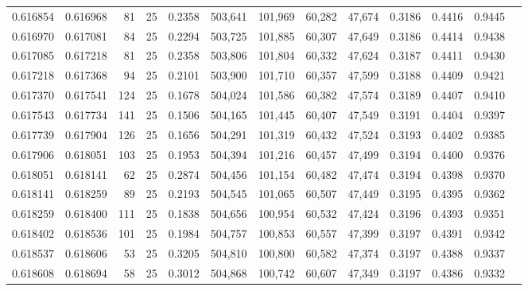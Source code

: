 \begin{tabular}{rrrrrrrrrrrrr}
0.616854 & 0.616968 &    81 &  25 &                                     0.2358 & 503,641 & 101,969 &  60,282 &  47,674 & 0.3186 & 0.4416 & 0.9445 \\
0.616970 & 0.617081 &    84 &  25 &                                     0.2294 & 503,725 & 101,885 &  60,307 &  47,649 & 0.3186 & 0.4414 & 0.9438 \\
0.617085 & 0.617218 &    81 &  25 &                                     0.2358 & 503,806 & 101,804 &  60,332 &  47,624 & 0.3187 & 0.4411 & 0.9430 \\
0.617218 & 0.617368 &    94 &  25 &                                     0.2101 & 503,900 & 101,710 &  60,357 &  47,599 & 0.3188 & 0.4409 & 0.9421 \\
0.617370 & 0.617541 &   124 &  25 &                                     0.1678 & 504,024 & 101,586 &  60,382 &  47,574 & 0.3189 & 0.4407 & 0.9410 \\
0.617543 & 0.617734 &   141 &  25 &                                     0.1506 & 504,165 & 101,445 &  60,407 &  47,549 & 0.3191 & 0.4404 & 0.9397 \\
0.617739 & 0.617904 &   126 &  25 &                                     0.1656 & 504,291 & 101,319 &  60,432 &  47,524 & 0.3193 & 0.4402 & 0.9385 \\
0.617906 & 0.618051 &   103 &  25 &                                     0.1953 & 504,394 & 101,216 &  60,457 &  47,499 & 0.3194 & 0.4400 & 0.9376 \\
0.618051 & 0.618141 &    62 &  25 &                                     0.2874 & 504,456 & 101,154 &  60,482 &  47,474 & 0.3194 & 0.4398 & 0.9370 \\
0.618141 & 0.618259 &    89 &  25 &                                     0.2193 & 504,545 & 101,065 &  60,507 &  47,449 & 0.3195 & 0.4395 & 0.9362 \\
0.618259 & 0.618400 &   111 &  25 &                                     0.1838 & 504,656 & 100,954 &  60,532 &  47,424 & 0.3196 & 0.4393 & 0.9351 \\
0.618402 & 0.618536 &   101 &  25 &                                     0.1984 & 504,757 & 100,853 &  60,557 &  47,399 & 0.3197 & 0.4391 & 0.9342 \\
0.618537 & 0.618606 &    53 &  25 &                                     0.3205 & 504,810 & 100,800 &  60,582 &  47,374 & 0.3197 & 0.4388 & 0.9337 \\
0.618608 & 0.618694 &    58 &  25 &                                     0.3012 & 504,868 & 100,742 &  60,607 &  47,349 & 0.3197 & 0.4386 & 0.9332 \\

\end{tabular}
